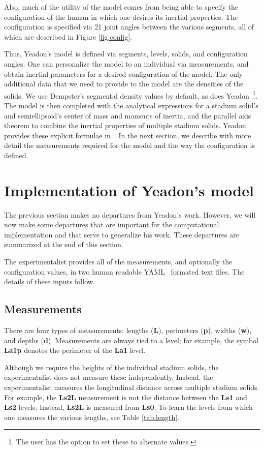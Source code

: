 \documentclass[10pt]{article}
\begin{document}
Also, much of the utility of the model comes from being able to specify the
configuration of the human in which one desires its inertial properties. The
configuration is specified via 21 joint angles between the various segments,
all of which are described in Figure \ref{fig:config}.

Thus, Yeadon's model is defined via segments, levels, solids, and configuration
angles. One can personalize the model to an individual via measurements, and
obtain inertial parameters for a desired configuration of the model. The only
additional data that we need to provide to the model are the densities of the
solids. We use Dempster's segmental density values \cite{Dempster1955} by
default, as does Yeadon~\footnote{The user has the option to set these to
alternate values.}. The model is then completed with the analytical
expressions for a stadium solid's and semiellipsoid's center of mass and
moments of inertia, and the parallel axis theorem to combine the inertial
properties of multiple stadium solids. Yeadon provides these explicit formulae
in~\cite{Yeadon1990f}. In the next section, we describe with more detail the
measurements required for the model and the way the configuration is defined.

\section*{Implementation of Yeadon's model}

The previous section makes no departures from Yeadon's work. However, we will
now make some departures that are important for the computational
implementation and that serve to generalize his work. These departures are
summarized at the end of this section.

The experimentalist provides all of the measurements, and
optionally the configuration values, in two human readable YAML~\cite{YAML2014}
formated text files. The details of these inputs follow.

\subsection*{Measurements}

There are four types of measurements: lengths (\textbf{L}), perimeters
(\textbf{p}), widths (\textbf{w}), and depths (\textbf{d}). Measurements are
always tied to a level; for example, the symbol \textbf{La1p} denotes the
perimeter of the \textbf{La1} level.

Although we require the heights of the individual stadium solids, the
experimentalist does not measure these independently. Instead, the
experimentalist measures the longitudinal distance across multiple stadium
solids. For example, the \textbf{Ls2L} measurement is not the distance between
the \textbf{Ls1} and \textbf{Ls2} levels. Instead, \textbf{Ls2L} is measured
from \textbf{Ls0}. To learn the levels from which one measures the various
lengths, see Table \ref{tab:length}.
\end{document}

